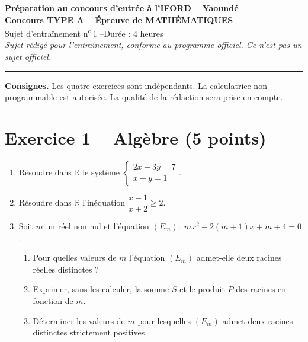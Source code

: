 \documentclass[11pt,a4paper]{article}
\begin{document}
\begin{center}
{\large\bfseries Préparation au concours d'entrée à l'IFORD -- Yaoundé}\\[2mm]
{\Large\bfseries Concours TYPE A -- Épreuve de MATHÉMATIQUES}\\[2mm]
Sujet d'entraînement n\textsuperscript{o}\,1 \quad --\quad Durée : 4 heures\\[1mm]
\emph{Sujet rédigé pour l'entraînement, conforme au programme officiel. Ce n'est pas un sujet officiel.}
\end{center}
\hrule\medskip

\noindent\textbf{Consignes.} Les quatre exercices sont indépendants. La calculatrice non
programmable est autorisée. La qualité de la rédaction sera prise en compte.

\section*{Exercice 1 -- Algèbre (5 points)}
\begin{enumerate}
  \item Résoudre dans $\mathbb{R}$ le système
  $\begin{cases} 2x + 3y = 7\\ x - y = 1\end{cases}$.
  \item Résoudre dans $\mathbb{R}$ l'inéquation $\dfrac{x-1}{x+2} \geqslant 2$.
  \item Soit $m$ un réel non nul et l'équation $(E_m) : \; m x^2 - 2(m+1)x + m + 4 = 0$.
  \begin{enumerate}[label=\alph*)]
    \item Pour quelles valeurs de $m$ l'équation $(E_m)$ admet-elle deux racines réelles distinctes ?
    \item Exprimer, sans les calculer, la somme $S$ et le produit $P$ des racines en fonction de $m$.
    \item Déterminer les valeurs de $m$ pour lesquelles $(E_m)$ admet deux racines distinctes strictement positives.
  \end{enumerate}
\end{enumerate}
\end{document}
